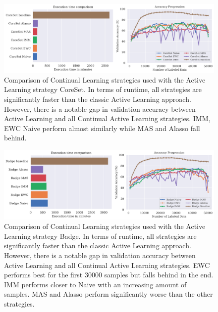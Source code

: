 \begin{figure} [ht]
    \centering
    \includegraphics[width=\linewidth]{images/results_CAL/CoreSet_CAL_1000b.png}
    \caption[Continual Active Learning CoreSet 1000 batch size]{Comparison of Continual Learning strategies used with the Active Learning strategy CoreSet. In terms of runtime, all
    strategies are significantly faster than the classic Active Learning approach. However, there is a notable gap in validation accuracy between Active Learning and all Continual
    Active Learning strategies. IMM, EWC Naive perform almost similarly while MAS and Alasso fall behind.}
    \label{fig:Evaluation:Results:CAL:CoreSet1000}
\end{figure}

\begin{figure} [ht]
    \centering
    \includegraphics[width=\linewidth]{images/results_CAL/Badge_CAL_1000b.png}
    \caption[Continual Active Learning Badge 1000 batch size]{Comparison of Continual Learning strategies used with the Active Learning strategy Badge. In terms of runtime, all
    strategies are significantly faster than the classic Active Learning approach. However, there is a notable gap in validation accuracy between Active Learning and all Continual
    Active Learning strategies. EWC performs best for the first 30000 samples but falls behind in the end. IMM performs closer to Naive with an increasing amount of samples. MAS and
    Alasso perform significantly worse than the other strategies.}
    \label{fig:Evaluation:Results:CAL:Badge1000}
\end{figure}




